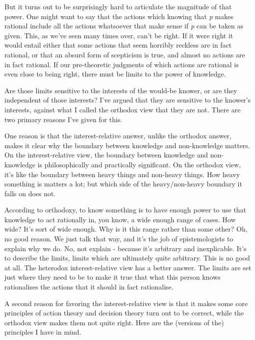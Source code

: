 \documentclass[
  12pt,
  letterpaper,
]{scrbook}
\begin{document}
But it turns out to be surprisingly hard to articulate the magnitude of
that power. One might want to say that the actions which knowing that
\emph{p} makes rational include all the actions whatsoever that make
sense if \emph{p} can be taken as given. This, as we've seen many times
over, can't be right. If it were right it would entail either that some
actions that seem horribly reckless are in fact rational, or that an
absurd form of scepticism is true, and almost no actions are in fact
rational. If our pre-theoretic judgments of which actions are rational
is even close to being right, there must be limits to the power of
knowledge.

Are those limits sensitive to the interests of the would-be knower, or
are they independent of those interests? I've argued that they are
sensitive to the knower's interests, against what I called the orthodox
view that they are not. There are two primary reasons I've given for
this.

One reason is that the interest-relative answer, unlike the orthodox
answer, makes it clear why the boundary between knowledge and
non-knowledge matters. On the interest-relative view, the boundary
between knowledge and non-knowledge is philosophically and practically
significant. On the orthodox view, it's like the boundary between heavy
things and non-heavy things. How heavy something is matters a lot; but
which side of the heavy/non-heavy boundary it falls on does not.

According to orthodoxy, to know something is to have enough power to use
that knowledge to act rationally in, you know, a wide enough range of
cases. How wide? It's sort of wide enough. Why is it this range rather
than some other? Oh, no good reason. We just talk that way, and it's the
job of epistemologists to explain why we do. No, not explain - because
it's arbitrary and inexplicable. It's to describe the limits, limits
which are ultimately quite arbitrary. This is no good at all. The
heterodox interest-relative view has a better answer. The limits are set
just where they need to be to make it true that what this person knows
rationalises the actions that it should in fact rationalise.

A second reason for favoring the interest-relative view is that it makes
some core principles of action theory and decision theory turn out to be
correct, while the orthodox view makes them not quite right. Here are
the (versions of the) principles I have in mind.
\end{document}
